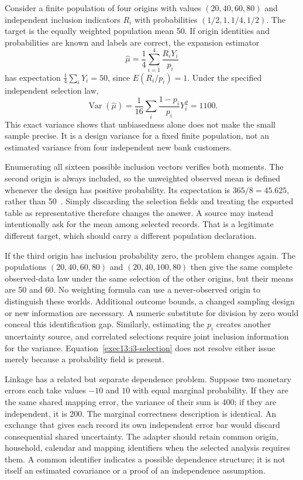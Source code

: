 Consider a finite population of four origins with values
$(20,40,60,80)$ and independent inclusion indicators $R_i$ with probabilities
$(1/2,1,1/4,1/2)$. The target is the equally weighted population mean 50.
If origin identities and probabilities are known and labels are correct,
the expansion estimator
\begin{equation}
 \widehat\mu=\frac14\sum_{i=1}^4\frac{R_iY_i}{p_i}
 \label{exec13:i3-selection}
\end{equation}
has expectation $\frac14\sum_iY_i=50$, since $E(R_i/p_i)=1$.
Under the specified independent selection law,
\[
 \operatorname{Var}(\widehat\mu)
    =\frac1{16}\sum_i\frac{1-p_i}{p_i}Y_i^2=1100.
\]
This exact variance shows that unbiasedness alone does not make the small
sample precise. It is a design variance for a fixed finite population, not
an estimated variance from four independent new bank customers.

Enumerating all sixteen possible inclusion vectors verifies both moments.
The second origin is always included, so the unweighted observed mean is
defined whenever the design has positive probability. Its expectation is
$365/8=45.625$, rather than 50~\citep{exec13_i3_examples}. Simply discarding
the selection fields and treating the exported table as representative
therefore changes the answer. A source may instead intentionally ask for the
mean among selected records. That is a legitimate different target, which
should carry a different population declaration.

If the third origin has inclusion probability zero, the problem changes
again. The populations $(20,40,60,80)$ and $(20,40,100,80)$ then give the
same complete observed-data law under the same selection of the other
origins, but their means are 50 and 60. No weighting formula can use a
never-observed origin to distinguish these worlds. Additional outcome bounds,
a changed sampling design or new information are necessary. A numeric
substitute for division by zero would conceal this identification gap.
Similarly, estimating the $p_i$ creates another uncertainty source, and
correlated selections require joint inclusion information for the variance.
Equation~\eqref{exec13:i3-selection} does not resolve either issue merely
because a probability field is present.

Linkage has a related but separate dependence problem. Suppose two monetary
errors each take values $-10$ and $10$ with equal marginal probability. If
they are the same shared mapping error, the variance of their sum is 400;
if they are independent, it is 200. The marginal correctness description is
identical. An exchange that gives each record its own independent error bar
would discard consequential shared uncertainty. The adapter should retain
common origin, household, calendar and mapping identifiers when the selected
analysis requires them. A common identifier indicates a possible dependence
structure; it is not itself an estimated covariance or a proof of an
independence assumption.

